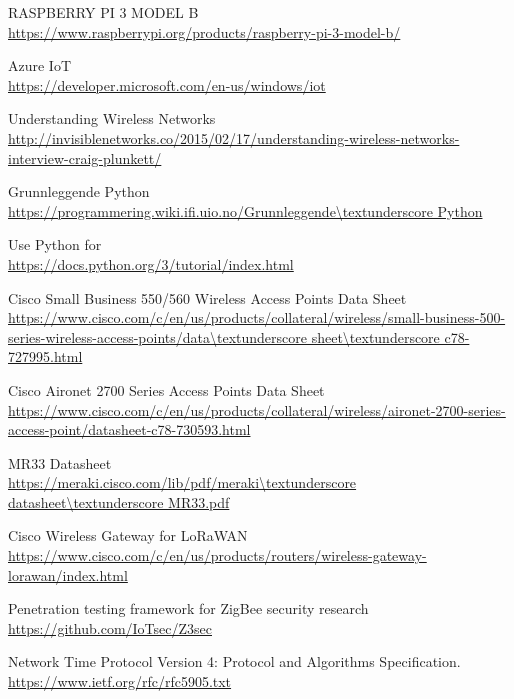 \documentclass{article}
\begin{document}
\begin{thebibliography}{50}


RASPBERRY PI 3 MODEL B
\\\url{https://www.raspberrypi.org/products/raspberry-pi-3-model-b/}

Azure IoT
\\\url{https://developer.microsoft.com/en-us/windows/iot}

Understanding Wireless Networks
\\\url{http://invisiblenetworks.co/2015/02/17/understanding-wireless-networks-interview-craig-plunkett/
}

Grunnleggende Python
\\\url{https://programmering.wiki.ifi.uio.no/Grunnleggende\textunderscore Python}

Use Python for
\\\url{https://docs.python.org/3/tutorial/index.html}


Cisco Small Business 550/560 Wireless Access Points Data Sheet
\\\url{https://www.cisco.com/c/en/us/products/collateral/wireless/small-business-500-series-wireless-access-points/data\textunderscore sheet\textunderscore c78-727995.html}

Cisco Aironet 2700 Series Access Points Data Sheet
\\\url{https://www.cisco.com/c/en/us/products/collateral/wireless/aironet-2700-series-access-point/datasheet-c78-730593.html}

MR33 Datasheet
\\\url{https://meraki.cisco.com/lib/pdf/meraki\textunderscore datasheet\textunderscore MR33.pdf}



Cisco Wireless Gateway for LoRaWAN
\\\url{https://www.cisco.com/c/en/us/products/routers/wireless-gateway-lorawan/index.html
}

Penetration testing framework for ZigBee security research
\\\url{https://github.com/IoTsec/Z3sec}

Network Time Protocol Version 4: Protocol and Algorithms Specification.
\\\url{https://www.ietf.org/rfc/rfc5905.txt}


\end{thebibliography}
\end{document}
